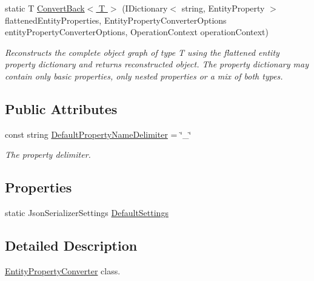 \begin{DoxyCompactItemize}
static T \hyperlink{classMicrosoft_1_1WindowsAzure_1_1Storage_1_1Table_1_1EntityPropertyConverter_a3beb7c8638a8f6a84bd16c0f0a00521d_a3beb7c8638a8f6a84bd16c0f0a00521d}{Convert\+Back$<$ T $>$} (I\+Dictionary$<$ string, Entity\+Property $>$ flattened\+Entity\+Properties, Entity\+Property\+Converter\+Options entity\+Property\+Converter\+Options, Operation\+Context operation\+Context)
\begin{DoxyCompactList}\small\item\em Reconstructs the complete object graph of type T using the flattened entity property dictionary and returns reconstructed object. The property dictionary may contain only basic properties, only nested properties or a mix of both types. \end{DoxyCompactList}\end{DoxyCompactItemize}
\subsection*{Public Attributes}
\begin{DoxyCompactItemize}
\item 
const string \hyperlink{classMicrosoft_1_1WindowsAzure_1_1Storage_1_1Table_1_1EntityPropertyConverter_a033985dcd943dd26b2dcb25c93a58193_a033985dcd943dd26b2dcb25c93a58193}{Default\+Property\+Name\+Delimiter} = \char`\"{}\+\_\+\char`\"{}
\begin{DoxyCompactList}\small\item\em The property delimiter. \end{DoxyCompactList}\end{DoxyCompactItemize}
\subsection*{Properties}
\begin{DoxyCompactItemize}
\item 
static Json\+Serializer\+Settings \hyperlink{classMicrosoft_1_1WindowsAzure_1_1Storage_1_1Table_1_1EntityPropertyConverter_ae422716e2356233ae6dda2bd9e73f250_ae422716e2356233ae6dda2bd9e73f250}{Default\+Settings}
\end{DoxyCompactItemize}


\subsection{Detailed Description}
\hyperlink{classMicrosoft_1_1WindowsAzure_1_1Storage_1_1Table_1_1EntityPropertyConverter}{Entity\+Property\+Converter} class. 



